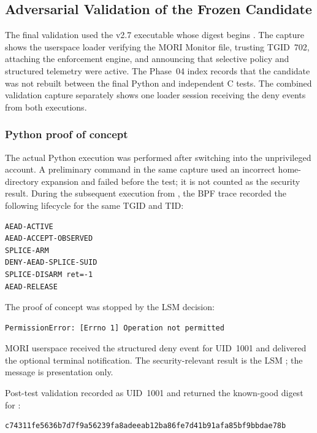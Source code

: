 \subsection{Adversarial Validation of the Frozen Candidate}

The final validation used the v2.7 executable whose digest begins
. The capture shows the userspace loader verifying the MORI
Monitor file, trusting TGID~702, attaching the enforcement engine, and
announcing that selective policy and structured telemetry were active. The
Phase~04 index records that the candidate was not rebuilt between the final
Python and independent C tests. The combined validation capture separately
shows one loader session receiving the deny events from both executions.

\subsubsection{Python proof of concept}

The actual Python execution was performed after switching into the unprivileged
 account. A preliminary command in the same capture used an
incorrect home-directory expansion and failed before the test; it is not
counted as the security result. During the subsequent execution from
, the BPF trace recorded the following lifecycle for the
same TGID and TID:

\begin{lstlisting}
AEAD-ACTIVE
AEAD-ACCEPT-OBSERVED
SPLICE-ARM
DENY-AEAD-SPLICE-SUID
SPLICE-DISARM ret=-1
AEAD-RELEASE
\end{lstlisting}

The proof of concept was stopped by the LSM decision:

\begin{lstlisting}
PermissionError: [Errno 1] Operation not permitted
\end{lstlisting}

MORI userspace received the structured deny event for UID~1001 and delivered
the optional terminal notification. The security-relevant result is the LSM
; the message is presentation only.

Post-test validation recorded  as UID~1001 and returned the
known-good digest for :

\begin{lstlisting}
c74311fe5636b7d7f9a56239fa8adeeab12ba86fe7d41b91afa85bf9bbdae78b
\end{lstlisting}

